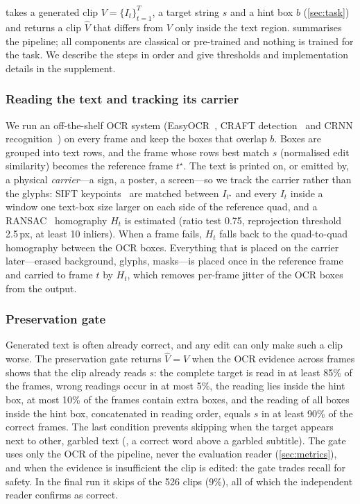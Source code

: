 \subsubsection{\method}
\label{sec:method}


\method takes a generated clip $V=\{I_t\}_{t=1}^{T}$, a target string $s$ and a hint box $b$ (\cref{sec:task}) and returns a clip $\hat V$ that differs from $V$ only inside the text region.  summarises the pipeline; all components are classical or pre-trained and nothing is trained for the task. We describe the steps in order and give thresholds and implementation details in the supplement.

\subsubsection{Reading the text and tracking its carrier}
\label{sec:read}
We run an off-the-shelf OCR system (EasyOCR~\cite{easyocr}, CRAFT detection~\cite{baek2019craft} and CRNN recognition~\cite{shi2017crnn}) on every frame and keep the boxes that overlap $b$. Boxes are grouped into text rows, and the frame whose rows best match $s$ (normalised edit similarity) becomes the reference frame $t^\star$. The text is printed on, or emitted by, a physical \emph{carrier}---a sign, a poster, a screen---so we track the carrier rather than the glyphs: SIFT keypoints~\cite{lowe2004sift} are matched between $I_{t^\star}$ and every $I_t$ inside a window one text-box size larger on each side of the reference quad, and a RANSAC~\cite{fischler1981ransac} homography $H_t$ is estimated (ratio test 0.75, reprojection threshold 2.5\,px, at least 10 inliers). When a frame fails, $H_t$ falls back to the quad-to-quad homography between the OCR boxes. Everything that is placed on the carrier later---erased background, glyphs, masks---is placed once in the reference frame and carried to frame $t$ by $H_t$, which removes per-frame jitter of the OCR boxes from the output.

\subsubsection{Preservation gate}
\label{sec:pres}
Generated text is often already correct, and any edit can only make such a clip worse. The preservation gate returns $\hat V=V$ when the OCR evidence across frames shows that the clip already reads $s$: the complete target is read in at least 85\% of the frames, wrong readings occur in at most 5\%, the reading lies inside the hint box, at most 10\% of the frames contain extra boxes, and the reading of all boxes inside the hint box, concatenated in reading order, equals $s$ in at least 90\% of the correct frames. The last condition prevents skipping when the target appears next to other, garbled text (\eg, a correct word above a garbled subtitle). The gate uses only the OCR of the pipeline, never the evaluation reader (\cref{sec:metrics}), and when the evidence is insufficient the clip is edited: the gate trades recall for safety. In the final run it skips \rSkipped{} of the 526 clips (9\%), all of which the independent reader confirms as correct.

